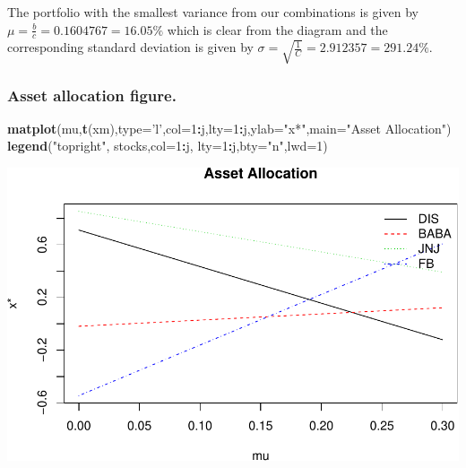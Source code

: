 \documentclass[]{article}
\newenvironment{Shaded}{\begin{snugshade}}{\end{snugshade}}
\newcommand{\KeywordTok}[1]{\textcolor[rgb]{0.13,0.29,0.53}{\textbf{#1}}}
\newcommand{\DataTypeTok}[1]{\textcolor[rgb]{0.13,0.29,0.53}{#1}}
\newcommand{\DecValTok}[1]{\textcolor[rgb]{0.00,0.00,0.81}{#1}}
\newcommand{\StringTok}[1]{\textcolor[rgb]{0.31,0.60,0.02}{#1}}
\newcommand{\OperatorTok}[1]{\textcolor[rgb]{0.81,0.36,0.00}{\textbf{#1}}}
\newcommand{\NormalTok}[1]{#1}
\begin{document}
The portfolio with the smallest variance from our combinations is given
by \(\mu = \frac{b}{c} = 0.1604767 = 16.05\%\) which is clear from the
diagram and the corresponding standard deviation is given by
\(\sigma= \sqrt{\frac{1}{C}} = 2.912357 = 291.24\%\).

\subsubsection{Asset allocation figure.}\label{asset-allocation-figure.}

\begin{Shaded}
\begin{Highlighting}[]
\KeywordTok{matplot}\NormalTok{(mu,}\KeywordTok{t}\NormalTok{(xm),}\DataTypeTok{type=}\StringTok{'l'}\NormalTok{,}\DataTypeTok{col=}\DecValTok{1}\OperatorTok{:}\NormalTok{j,}\DataTypeTok{lty=}\DecValTok{1}\OperatorTok{:}\NormalTok{j,}\DataTypeTok{ylab=}\StringTok{"x*"}\NormalTok{,}\DataTypeTok{main=}\StringTok{"Asset Allocation"}\NormalTok{)}
\KeywordTok{legend}\NormalTok{(}\StringTok{"topright"}\NormalTok{, stocks,}\DataTypeTok{col=}\DecValTok{1}\OperatorTok{:}\NormalTok{j, }\DataTypeTok{lty=}\DecValTok{1}\OperatorTok{:}\NormalTok{j,}\DataTypeTok{bty=}\StringTok{"n"}\NormalTok{,}\DataTypeTok{lwd=}\DecValTok{1}\NormalTok{)}
\end{Highlighting}
\end{Shaded}

\includegraphics{Markowitz_Research_Me_files/figure-latex/unnamed-chunk-16-1.pdf}
\end{document}

